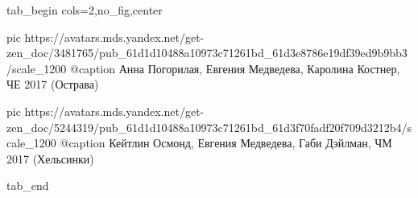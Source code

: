  
 
 
 
 


\ifcmt
  tab_begin cols=2,no_fig,center

     pic https://avatars.mds.yandex.net/get-zen_doc/3481765/pub_61d1d10488a10973c71261bd_61d3e8786e19df39ed9b9bb3/scale_1200
		 @caption Анна Погорилая, Евгения Медведева, Каролина Костнер, ЧЕ 2017 (Острава)

		 pic https://avatars.mds.yandex.net/get-zen_doc/5244319/pub_61d1d10488a10973c71261bd_61d3f70fadf20f709d3212b4/scale_1200
		 @caption Кейтлин Осмонд, Евгения Медведева, Габи Дэйлман, ЧМ 2017 (Хельсинки)

  tab_end
\fi
